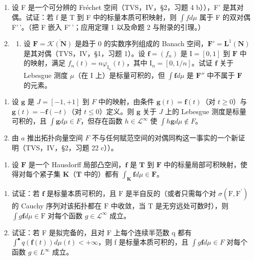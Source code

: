 \begin{enumerate}
\def\labelenumi{\arabic{enumi})}
\setcounter{enumi}{5}
\item
  设 F 是一个可分辨的 Fréchet 空间（TVS，IV，§2，习题 4 b）），F' 是其对偶。试证：若 f 是 T 到 F 中的标量本质可积映射，则 \(\int f d\mu\) 属于 F 的双对偶 F'\,'。（把 F 嵌入 F'\,'；应用定理 1 以及命题 2 与附录的引理。）
\item
  \begin{enumerate}
  \def\labelenumii{\alph{enumii})}
  \tightlist
  \item
    设 \(\mathbf{F} = \overline{\mathcal{K}(\mathbf{N})}\) 是趋于 0 的实数序列组成的 Banach 空间，\(\mathbf{F}' = \mathbf{L}^1 (\mathbf{N})\) 是其对偶（TVS，IV，§1，习题 1）。设 \(\mathbf{f} = (f_n)\) 是 \(\mathrm{I} = [0,1]\) 到 \(\mathbf{F}\) 中的映射，满足 \(f_{n}(t) = n\varphi_{\mathrm{I}_{n}}(t)\)，其中 \(\mathrm{I}_n = [0,1 / n]\)。试证 \(\mathbf{f}\) 关于 Lebesgue 测度 \(\mu\)（在 \(\mathrm{I}\) 上）是标量可积的，但 \(\int \mathbf{f}d\mu\) 是 \(\mathbf{F}''\) 中不属于 \(\mathbf{F}\) 的元素。
  \end{enumerate}
\end{enumerate}

\begin{enumerate}
\def\labelenumi{\alph{enumi})}
\setcounter{enumi}{1}
\item
  设 \(\mathbf{g}\) 是 \(J = [-1, +1]\) 到 \(F\) 中的映射，由条件 \(\mathbf{g}(t) = \mathbf{f}(t)\)（对 \(t \geqslant 0\)）与 \(\mathbf{g}(t) = -\mathbf{f}(-t)\)（对 \(t \leqslant 0\)）定义。则 \(\mathbf{g}\) 关于 \(J\) 上的 Lebesgue 测度是标量可积的，且 \(\int \mathbf{g} d\mu \in F\)，但存在函数 \(h \in \mathcal{L}^{\infty}\) 使 \(\int h\mathbf{g} d\mu \notin F\)。
\item
  由 \(a\) 推出拓扑向量空间 \(F\) 不与任何赋范空间的对偶同构这一事实的一个新证明（TVS，IV，§2，习题 22 c））。
\end{enumerate}

\begin{enumerate}
\def\labelenumi{\arabic{enumi})}
\setcounter{enumi}{7}
\tightlist
\item
  设 \(\mathbf{F}\) 是一个 Hausdorff 局部凸空间，\(\mathbf{f}\) 是 \(\mathbf{T}\) 到 \(\mathbf{F}\) 中的标量局部可积映射，使得对每个紧子集 \(\mathbf{K}\)（\(\mathbf{T}\) 中的）都有 \(\int_{\mathbf{K}} \mathbf{f} d\mu \in \mathbf{F}\)。
\end{enumerate}

\begin{enumerate}
\def\labelenumi{\alph{enumi})}
\item
  试证：若 \(\mathbf{f}\) 是标量本质可积的，且 \(\mathrm{F}\) 是半自反的（或者只需每个对 \(\sigma (\mathrm{F},\mathrm{F}^{\prime})\) 的 Cauchy 序列对该拓扑都在 \(\mathrm{F}\) 中收敛，当 \(\mathrm{T}\) 是无穷远处可数时），则 \(\int g\mathbf{f}d\mu \in \mathrm{F}\) 对每个函数 \(g\in \mathcal{L}^{\infty}\) 成立。
\item
  试证：若 F 是拟完备的，且对 F 上每个连续半范数 q 都有 \(\int^{\bullet} q(\mathbf{f}(t)) d\mu(t) < +\infty\)，则 f 是标量本质可积的，且 \(\int g\mathbf{f} d\mu \in F\) 对每个函数 \(g \in L^{\infty}\) 成立。
\end{enumerate}

